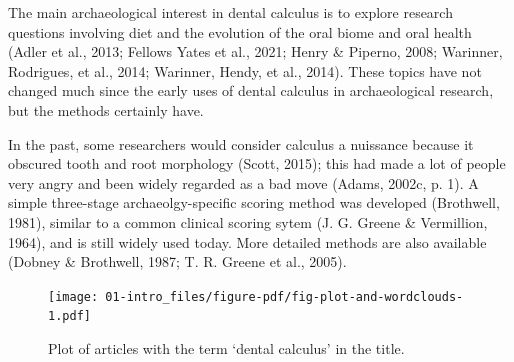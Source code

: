 \documentclass[
  letterpaper,
]{book}
\begin{document}
The main archaeological interest in dental calculus is to explore
research questions involving diet and the evolution of the oral biome
and oral health (Adler et al., 2013; Fellows Yates et al., 2021; Henry
\& Piperno, 2008; Warinner, Rodrigues, et al., 2014; Warinner, Hendy, et
al., 2014). These topics have not changed much since the early uses of
dental calculus in archaeological research, but the methods certainly
have.

In the past, some researchers would consider calculus a nuissance
because it obscured tooth and root morphology (Scott, 2015); this had
made a lot of people very angry and been widely regarded as a bad move
(Adams, 2002c, p. 1). A simple three-stage archaeolgy-specific scoring
method was developed (Brothwell, 1981), similar to a common clinical
scoring sytem (J. G. Greene \& Vermillion, 1964), and is still widely
used today. More detailed methods are also available (Dobney \&
Brothwell, 1987; T. R. Greene et al., 2005).

\begin{figure}

{\centering \texttt{[image: 01-intro\_files/figure-pdf/fig-plot-and-wordclouds-1.pdf]}

}

\caption{\label{fig-plot-and-wordclouds}Plot of articles with the term
`dental calculus' in the title.}

\end{figure}
\end{document}

